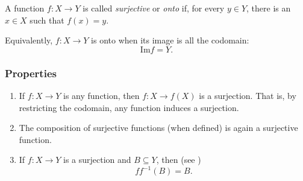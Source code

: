\documentclass[12pt]{article}
\begin{document}
A function $f\colon X\to Y$ is called \emph{surjective} or \emph{onto} if, for every $y\in Y$, there is an $x\in X$ such that $f(x)=y$.

Equivalently, $f\colon X\to Y$ is onto when its image is all the codomain:
$$\mathrm{Im} f= Y.$$

\subsubsection*{Properties}
\begin{enumerate}
\item If $f\colon X\to Y$ is any function, then $f\colon X\to f(X)$ is
      a surjection. That is, by restricting the codomain, 
      any function induces a surjection. 
\item The composition of surjective functions (when defined) is 
      again a surjective function. 
\item If $f\colon X\to Y$ is a surjection and $B\subseteq Y$, then 
(see )
$$
   f f^{-1}(B) = B.
$$
\end{enumerate}
\end{document}
